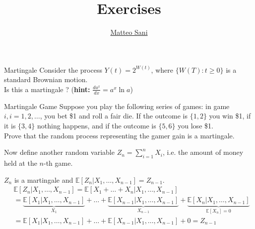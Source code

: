 \documentclass{beamer}
\title{Exercises}
\author{\href{mailto:matteo.sani@unisi.it}{Matteo Sani}}
\begin{document}
\begin{frame}[plain]
  \maketitle
\end{frame}

\begin{frame}{}
\begin{block}{Martingale}
Consider the process $Y(t) = 2^{W(t)}$, where $\{W(T):t\geq 0\}$ is a standard Brownian motion. \\
Is this a martingale ? (\textbf{hint:} $\frac{da^x}{dx}=a^x\ln a$)
\end{block}
\end{frame}

\begin{frame}{}
\begin{block}{Martingale Game}
Suppose you play the following series of games: in game $i, i = 1, 2,\ldots$, you bet \$1 and roll a fair die. If the outcome is $\{1,2\}$ you win \$1, if it is $\{3,4\}$ nothing happens, and if the outcome is $\{5,6\}$ you lose \$1.\\
Prove that the random process representing the gamer gain is a martingale.
\end{block}
\end{frame}

\begin{frame}{}
Now define another random variable $Z_n = \sum_{i=1}^{n} X_i$, i.e. the amount of money held at the $n$-th game.

$Z_n$ is a martingale and $\mathbb{E}[Z_n|X_1,\ldots, X_{n-1}] = Z_{n-1}$.
\begin{equation*}
	\begin{aligned}
		&\mathbb{E}[Z_n|X_1,\ldots, X_{n-1}] = \mathbb{E}[X_1 +\ldots + X_n|X_1,\ldots, X_{n-1}] \\
		& = \underbrace{\mathbb{E}[X_1|X_1,\ldots, X_{n-1}]}_{X_1} + \ldots + \underbrace{\mathbb{E}[X_{n-1}|X_1,\ldots, X_{n-1}]}_{X_{n-1}} + \underbrace{\mathbb{E}[X_n|X_1,\ldots, X_{n-1}]}_{\mathbb{E}[X_n]=0} \\
		& = \mathbb{E}[X_1|X_1,\ldots, X_{n-1}] + \ldots + \mathbb{E}[X_{n-1}|X_1,\ldots, X_{n-1}] + 0 = Z_{n-1}
	\end{aligned}
\end{equation*}
\end{frame}
\end{document}
